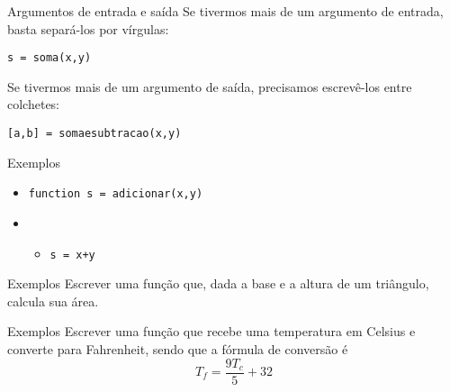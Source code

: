 \documentclass[hyperref={pdfpagelabels=false}]{beamer}
\begin{document}
\begin{frame}{Argumentos de entrada e saída}
  Se tivermos mais de um argumento de entrada, basta separá-los por vírgulas:
  
  \texttt{s = soma(x,y)}
  
  Se tivermos mais de um argumento de saída, precisamos escrevê-los entre colchetes:
  
  \texttt{[a,b] = somaesubtracao(x,y)}
\end{frame}

\begin{frame}{Exemplos}
  \begin{itemize}
  \item[] \texttt{function s = adicionar(x,y)}
  \item[] \begin{itemize}
  \item[] \texttt{s = x+y}
  \end{itemize}
  \end{itemize}
\end{frame}

\begin{frame}{Exemplos}
   Escrever uma função que, dada a base e a altura de um triângulo, calcula sua área.
   
\end{frame}

\begin{frame}{Exemplos}
	Escrever uma função que recebe uma temperatura em Celsius e converte para Fahrenheit, sendo que a fórmula de conversão é
	$$T_f = \frac{9 T_c}{5}+32$$
	\only<2>{}
\end{frame}
\end{document}

